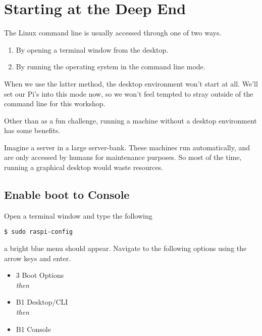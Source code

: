 \section{Starting at the Deep End}

	The Linux command line is usually accessed through one of two ways.
	
	\begin{enumerate}[noitemsep]
		\item By opening a terminal window from the desktop.
		\item By running the operating system in the command line mode.
	\end{enumerate}
	
	When we use the latter method, the desktop environment won't start at all. We'll set our Pi's into this mode now, so we won't feel tempted to stray outside of the command line for this workshop.
	
	\begin{aside}
		Other than as a fun challenge, running a machine without a desktop environment has some benefits.
		
		Imagine a server in a large server-bank. These machines run automatically, and are only accessed by humans for maintenance purposes. So most of the time, running a graphical desktop would waste resources.
	\end{aside}

	\subsection{Enable boot to Console}
	
		Open a terminal window and type the following
		
\begin{lstlisting}[style=Terminal]
$ sudo raspi-config
\end{lstlisting}
	
		a bright blue menu should appear. Navigate to the following options using the arrow keys and enter.
		
		\begin{itemize}[nosep]
			\item 3 Boot Options\\\textit{then}
			\item B1 Desktop/CLI\\\textit{then}
			\item B1 Console
		\end{itemize}
	
